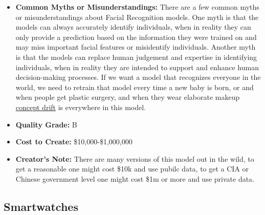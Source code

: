 \begin{itemize}
    \item \textbf{Common Myths or Misunderstandings:} There are a few common myths or misunderstandings about Facial Recognition models. One myth is that the models can always accurately identify individuals, when in reality they can only provide a prediction based on the information they were trained on and may miss important facial features or misidentify individuals. Another myth is that the models can replace human judgement and expertise in identifying individuals, when in reality they are intended to support and enhance human decision-making processes. If we want a model that recognizes everyone in the world, we need to retrain that model every time a new baby is born, or and when people get plastic surgery, and when they wear elaborate makeup \hyperref[sec:drift]{concept drift} is everywhere in this model.  
    \item \textbf{Quality Grade:} B
    \item \textbf{Cost to Create:} \$10,000-\$1,000,000
    \item \textbf{Creator's Note:} There are many versions of this model out in the wild, to get a reasonable one might cost \$10k and use pubilc data, to get a CIA or Chinese government level one might cost \$1m or more and use private data. 
\end{itemize}

\subsection{Smartwatches} 

